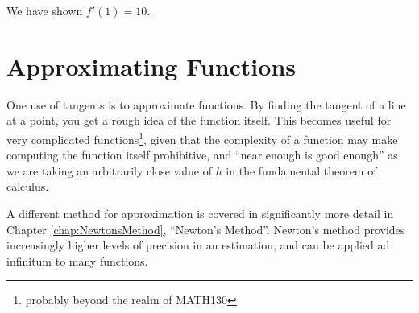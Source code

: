 We have shown $f'(1) = 10$.

\section{Approximating Functions}
\label{sec:ApproximatingFunctions}
One use of tangents is to approximate functions. By finding the tangent of a
line at a point, you get a rough idea of the function itself. This becomes
useful for very complicated functions\footnote{probably beyond the realm of
MATH130}, given that the complexity of a function may make computing the
function itself prohibitive, and ``near enough is good enough'' as we are taking
an arbitrarily close value of $h$ in the fundamental theorem of calculus.

A different method for approximation is covered in significantly more detail
in Chapter \ref{chap:NewtonsMethod}, ``Newton's Method''. Newton's method
provides increasingly higher levels of precision in an estimation, and can be
applied ad infinitum to many functions.

